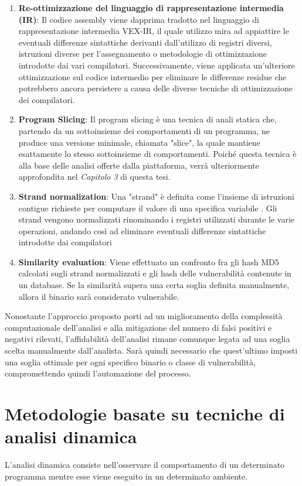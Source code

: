\documentclass[../main.tex]{subfiles}
\begin{document}
\begin{enumerate}
    \item \textbf{Re-ottimizzazione del linguaggio di rappresentazione intermedia (IR)}: Il codice assembly viene dapprima tradotto nel linguaggio di rappresentazione intermedia VEX-IR, il quale utilizzo
    mira ad appiattire le eventuali differenze sintattiche derivanti dall'utilizzo di registri diversi, istruzioni diverse per l'assegnamento o metodologie di ottimizzazione introdotte dai vari compilatori.
    Successivamente, viene applicata un'ulteriore ottimizzazione sul codice intermedio per eliminare le differenze residue che potrebbero ancora persistere a causa delle diverse tecniche di ottimizzazione dei compilatori.
    \item \textbf{Program Slicing}: Il program slicing è una tecnica di anali statica che, partendo da un sottoinsieme dei comportamenti di un programma, ne produce una versione minimale, chiamata "slice",  la quale mantiene esattamente lo stesso sottoinsieme di comportamenti.
    Poiché questa tecnica è alla base delle analisi offerte dalla piattaforma, verrà ulteriormente approfondita nel \textit{Capitolo 3} di questa tesi.
    \item \textbf{Strand normalization}: Una "strand" è definita come l'insieme di istruzioni contigue richieste per computare il valore di una specifica variabile \cite{Statistical_similarities_in_binaries}.
    Gli strand vengono normalizzati rinominando i registri utilizzati durante le varie operazioni, andando così ad eliminare eventuali differenze sintattiche introdotte dai compilatori
    \item \textbf{Similarity evaluation}: Viene effettuato un confronto fra gli hash MD5 calcolati sugli strand normalizzati e gli hash delle vulnerabilità contenute in un database. Se la similarità supera una certa soglia definita manualmente, allora
    il binario sarà considerato vulnerabile.
\end{enumerate}
Nonostante l'approccio proposto porti ad un miglioramento della complessità computazionale dell'analisi e alla mitigazione del numero di falsi positivi e negativi rilevati, l'affidabilità dell'analisi rimane comunque legata ad una soglia scelta manualmente dall'analista.
Sarà quindi necessario che quest'ultimo imposti una soglia ottimale per ogni specifico binario o classe di vulnerabilità, compromettendo quindi l'automazione del processo.






























\section{Metodologie basate su tecniche di analisi dinamica}
L'analisi dinamica consiste nell'osservare il comportamento di un determinato programma mentre esse viene eseguito in un determinato ambiente.
\end{document}
